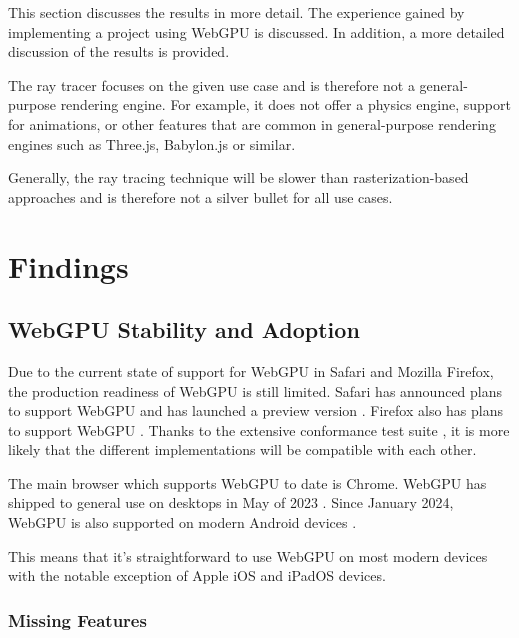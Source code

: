 
This section discusses the results in more detail. The experience gained by implementing a project using WebGPU is discussed. In addition, a more detailed discussion of the results is provided.

The ray tracer focuses on the given use case and is therefore not a general-purpose rendering engine. For example, it does not offer a physics engine, support for animations, or other features that are common in general-purpose rendering engines such as \gls{Three.js}, \gls{Babylon.js} or similar.

Generally, the ray tracing technique will be slower than rasterization-based approaches and is therefore not a silver bullet for all use cases.

\section{Findings}
\subsection{WebGPU Stability and Adoption}

Due to the current state of support for WebGPU in Safari and Mozilla Firefox, the production readiness of WebGPU is still limited. Safari has announced plans to support WebGPU and has launched a preview version \cite{SafariWebGPUSupport}. Firefox also has plans to support WebGPU \cite{FirefoxWebGPUSupport}. Thanks to the extensive conformance test suite \cite{WebGPUConformanceTestSuite}, it is more likely that the different implementations will be compatible with each other.

The main browser which supports WebGPU to date is Chrome. WebGPU has shipped to general use on desktops in May of 2023 \cite{ChromeWebGPUSupport}. Since January 2024, WebGPU is also supported on modern Android devices \cite{ChromeAndroidWebGPUSupport}.

This means that it's straightforward to use WebGPU on most modern devices with the notable exception of Apple iOS and iPadOS devices.

\subsubsection{Missing Features}

